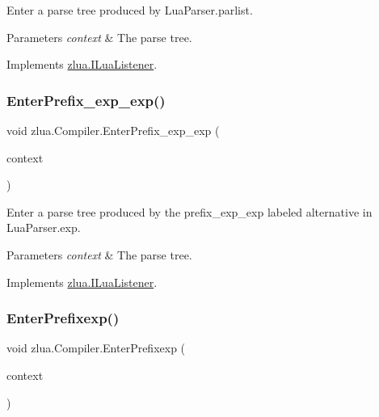 Enter a parse tree produced by Lua\+Parser.\+parlist. 


\begin{DoxyParams}{Parameters}
{\em context} & The parse tree.\\
\hline
\end{DoxyParams}


Implements \mbox{\hyperlink{interfacezlua_1_1_i_lua_listener_a406fd2bdc9cefe77567f3012bed007e9}{zlua.\+I\+Lua\+Listener}}.

\mbox{\label{classzlua_1_1_compiler_ad48048f780b0cb63ea44f0e45f26ddea}} 
\subsubsection{\texorpdfstring{Enter\+Prefix\+\_\+exp\+\_\+exp()}{EnterPrefix\_exp\_exp()}}
{\footnotesize\ttfamily void zlua.\+Compiler.\+Enter\+Prefix\+\_\+exp\+\_\+exp (\begin{DoxyParamCaption}\item[{\mbox{[}\+Not\+Null\mbox{]} \mbox{\hyperlink{classzlua_1_1_lua_parser_1_1_prefix__exp__exp_context}{Lua\+Parser.\+Prefix\+\_\+exp\+\_\+exp\+Context}}}]{context }\end{DoxyParamCaption})}



Enter a parse tree produced by the {\ttfamily prefix\+\_\+exp\+\_\+exp} labeled alternative in Lua\+Parser.\+exp. 


\begin{DoxyParams}{Parameters}
{\em context} & The parse tree.\\
\hline
\end{DoxyParams}


Implements \mbox{\hyperlink{interfacezlua_1_1_i_lua_listener_a4b07c7ca53f3650fc8b83891467f7a66}{zlua.\+I\+Lua\+Listener}}.

\mbox{\label{classzlua_1_1_compiler_a275bfb29b3cb0fd2322f2a58d6de2e22}} 
\subsubsection{\texorpdfstring{Enter\+Prefixexp()}{EnterPrefixexp()}}
{\footnotesize\ttfamily void zlua.\+Compiler.\+Enter\+Prefixexp (\begin{DoxyParamCaption}\item[{\mbox{[}\+Not\+Null\mbox{]} \mbox{\hyperlink{classzlua_1_1_lua_parser_1_1_prefixexp_context}{Lua\+Parser.\+Prefixexp\+Context}}}]{context }\end{DoxyParamCaption})}



